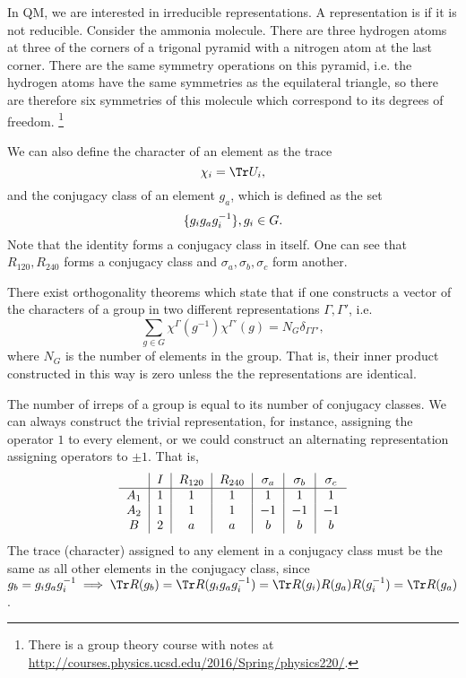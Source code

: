 In QM, we are interested in irreducible representations. A representation is  if it is not reducible. Consider the ammonia molecule. There are three hydrogen atoms at three of the corners of a trigonal pyramid with a nitrogen atom at the last corner. There are the same symmetry operations on this pyramid, i.e. the hydrogen atoms have the same symmetries as the equilateral triangle, so there are therefore six symmetries of this molecule which correspond to its degrees of freedom.%
    \footnote{There is a group theory course with notes at \url{http://courses.physics.ucsd.edu/2016/Spring/physics220/}.}

We can also define the character of an element as the trace
\begin{equation}
    \chi_i = \Tr U_i,
\end{equation}
and the conjugacy class of an element $g_a$, which is defined as the set
\begin{equation}
    \{g_i g_a g_i^{-1}\}, g_i \in G.
\end{equation}
Note that the identity forms a conjugacy class in itself. One can see that $R_{120},R_{240}$ forms a conjugacy class and $\sigma_a,\sigma_b,\sigma_c$ form another.

There exist orthogonality theorems which state that if one constructs a vector of the characters of a group in two different representations $\Gamma,\Gamma'$, i.e.
\begin{equation}
    \sum_{g\in G}\chi^\Gamma(g^{-1}) \chi^{\Gamma'}(g) = N_G \delta_{\Gamma \Gamma'},
\end{equation}
where $N_G$ is the number of elements in the group. That is, their inner product constructed in this way is zero unless the the representations are identical.

The number of irreps of a group is equal to its number of conjugacy classes. We can always construct the trivial representation, for instance, assigning the operator $1$ to every element, or we could construct an alternating representation assigning operators to $\pm 1$. That is,
\begin{equation}
    \begin{tabular}{c|c|c|c|c|c|c}
         & $I$ & $R_{120}$ & $R_{240}$ & $\sigma_a$ & $\sigma_b$ & $\sigma_c $\\\hline
         $A_1$ & $1$ & $1$ & $1$ & $1$ & $1$ & $1$\\
         $A_2$ & $1$ & $1$ & $1$ & $-1$& $-1$& $-1$\\
         $B$& $2$ & $a$& $a$& $b$& $b$& $b$
    \end{tabular}
\end{equation}
The trace (character) assigned to any element in a conjugacy class must be the same as all other elements in the conjugacy class, since $g_b = g_i g_a g_i^{-1} \implies \Tr R(g_b) = \Tr R(g_i g_a g_i^{-1}) = \Tr R(g_i) R(g_a) R(g_i^{-1}) = \Tr R(g_a)$.

